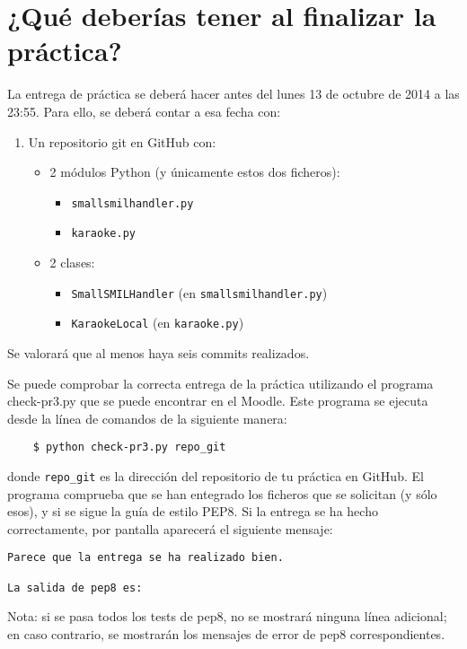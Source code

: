 \documentclass[11pt,a4paper]{article}
\begin{document}
\section{¿Qué deberías tener al finalizar la práctica?}

La entrega de práctica se deberá hacer antes del lunes 13 de octubre de 2014 a las 23:55. Para ello, se deberá contar a esa fecha con:

\begin{enumerate}
  \item Un repositorio git en GitHub con:
  \begin{itemize}
    \item 2 módulos Python (y únicamente estos dos ficheros):
    \begin{itemize}
      \item \texttt{smallsmilhandler.py}
      \item \texttt{karaoke.py}
    \end{itemize}
    \item 2 clases:
    \begin{itemize}
      \item \texttt{SmallSMILHandler} (en \texttt{smallsmilhandler.py})
      \item \texttt{KaraokeLocal} (en \texttt{karaoke.py})
    \end{itemize}
  \end{itemize}
\end{enumerate}

Se valorará que al menos haya seis commits realizados.

Se puede comprobar la correcta entrega de la práctica utilizando el programa check-pr3.py que se puede encontrar en el Moodle. Este programa se ejecuta desde la línea de comandos de la siguiente manera:
\begin{verbatim}
	$ python check-pr3.py repo_git
\end{verbatim}

donde \texttt{repo\_git} es la dirección del repositorio de tu práctica en GitHub. El programa comprueba que se han entegrado los ficheros que se solicitan (y sólo esos), y si se sigue la guía de estilo PEP8. Si la entrega se ha hecho correctamente, por pantalla aparecerá el siguiente mensaje:

\begin{verbatim}
Parece que la entrega se ha realizado bien. 

La salida de pep8 es:
\end{verbatim}

Nota: si se pasa todos los tests de pep8, no se mostrará ninguna línea adicional; en caso contrario, se mostrarán los mensajes de error de pep8 correspondientes.
\end{document}
